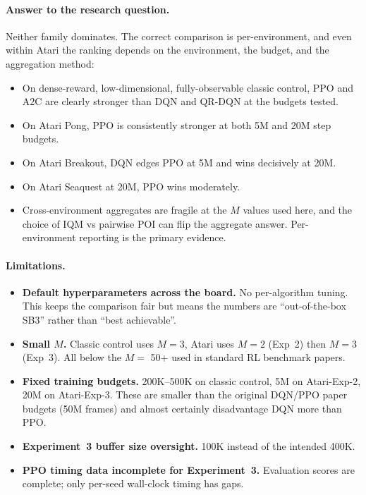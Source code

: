 \documentclass[11pt,a4paper]{article}
\begin{document}
\paragraph{Answer to the research question.}
Neither family dominates. The correct comparison is per-environment, and
even within Atari the ranking depends on the environment, the budget,
and the aggregation method:
\begin{itemize}[leftmargin=*]
  \item On dense-reward, low-dimensional, fully-observable classic
  control, PPO and A2C are clearly stronger than DQN and QR-DQN at the
  budgets tested.
  \item On Atari Pong, PPO is consistently stronger at both 5M and 20M
  step budgets.
  \item On Atari Breakout, DQN edges PPO at 5M and wins decisively at
  20M.
  \item On Atari Seaquest at 20M, PPO wins moderately.
  \item Cross-environment aggregates are fragile at the $M$ values used
  here, and the choice of IQM vs pairwise POI can flip the aggregate
  answer. Per-environment reporting is the primary evidence.
\end{itemize}

\paragraph{Limitations.}
\begin{itemize}[leftmargin=*]
  \item \textbf{Default hyperparameters across the board.} No per-algorithm
  tuning. This keeps the comparison fair but means the numbers are
  ``out-of-the-box SB3'' rather than ``best achievable''.
  \item \textbf{Small $M$.} Classic control uses $M=3$, Atari uses $M=2$
  (Exp~2) then $M=3$ (Exp~3). All below the $M=$ 50+ used in standard RL
  benchmark papers.
  \item \textbf{Fixed training budgets.} 200K--500K on classic control,
  5M on Atari-Exp-2, 20M on Atari-Exp-3. These are smaller than the
  original DQN/PPO paper budgets (50M frames) and almost certainly
  disadvantage DQN more than PPO.
  \item \textbf{Experiment~3 buffer size oversight.} 100K instead of the
  intended 400K.
  \item \textbf{PPO timing data incomplete for Experiment~3.} Evaluation
  scores are complete; only per-seed wall-clock timing has gaps.
\end{itemize}
\end{document}

